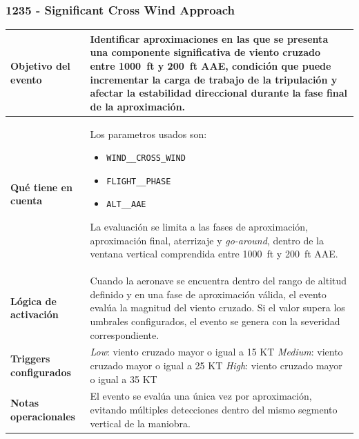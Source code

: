 \documentclass[11pt,a4paper]{article}
\begin{document}
	\subsubsection{1235 - Significant Cross Wind Approach}
	\begin{table}[H]
		\centering
		\renewcommand{\arraystretch}{1.3}
		\begin{tabular}{p{5cm} p{9.5cm}}
			\hline
			\textbf{Objetivo del evento} &
			Identificar aproximaciones en las que se presenta una componente significativa de viento cruzado entre \SI{1000}{ft} y \SI{200}{ft} AAE, condición que puede incrementar la carga de trabajo de la tripulación y afectar la estabilidad direccional durante la fase final de la aproximación. \\
			\hline
			\textbf{Qué tiene en cuenta} & Los parametros usados son:
			\begin{itemize}
				\item \texttt{WIND\_\_CROSS\_WIND}
				\item \texttt{FLIGHT\_\_PHASE}
				\item \texttt{ALT\_\_AAE}
			\end{itemize}
			La evaluación se limita a las fases de aproximación, aproximación final, aterrizaje y \textit{go-around}, dentro de la ventana vertical comprendida entre \SI{1000}{ft} y \SI{200}{ft} AAE. \\
			\hline
			\textbf{Lógica de activación} &
			Cuando la aeronave se encuentra dentro del rango de altitud definido y en una fase de aproximación válida, el evento evalúa la magnitud del viento cruzado. Si el valor supera los umbrales configurados, el evento se genera con la severidad correspondiente. \\
			\hline
			\textbf{Triggers configurados} &
			\textit{Low}: viento cruzado mayor o igual a 15 KT \newline
			\textit{Medium}: viento cruzado mayor o igual a 25 KT \newline
			\textit{High}: viento cruzado mayor o igual a 35 KT \\
			\hline
			\textbf{Notas operacionales} &
			El evento se evalúa una única vez por aproximación, evitando múltiples detecciones dentro del mismo segmento vertical de la maniobra. \\
			\hline
		\end{tabular}
	\end{table}
\end{document}
